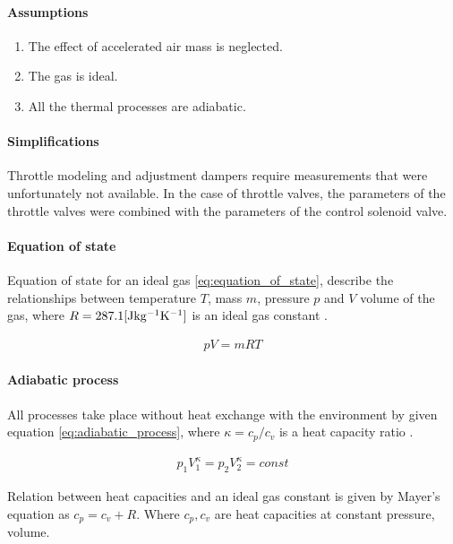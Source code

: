 \paragraph{Assumptions}\label{assumptions}

\begin{enumerate}
    \item The effect of accelerated air mass is neglected. 
    \item The gas is ideal. 
    \item All the thermal processes are adiabatic.
\end{enumerate}

\paragraph{Simplifications}
Throttle modeling and adjustment dampers require measurements that were
unfortunately not available. In the case of throttle valves, the parameters
of the throttle valves were combined with the parameters of the control
solenoid valve.


\paragraph{Equation of state}
Equation of state for an ideal gas \ref{eq:equation_of_state}, describe the
relationships between temperature $T$, mass $m$, pressure $p$ and $V$
volume  of the gas, where $R=287.1 \rm [Jkg^{-1}K^{-1}]$ is an ideal gas
constant \cite{fluid}.

\begin{align}
    pV = mRT
    \label{eq:equation_of_state}
\end{align} 

\paragraph{Adiabatic process}
All processes take place without heat exchange with the environment by
given equation \ref{eq:adiabatic_process}, where $\kappa = c_p/c_v$ is a
heat capacity ratio \cite{fluid}.

\begin{align}
     p_1V_1^{\kappa} =  p_2V_2^{\kappa} = const
    \label{eq:adiabatic_process}
\end{align}

Relation between heat capacities and an ideal gas constant is given
by Mayer's equation as $c_p = c_v + R$. Where $c_p, c_v$ are heat
capacities at constant pressure, volume.



